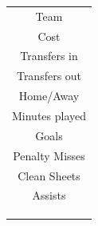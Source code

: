 \begin{table}[H]
\begin{minipage}{.5\textwidth}
\begin{tabular}{c}
Team                                  \\
Cost                                  \\
Transfers in                          \\
Transfers out                         \\
Home/Away                             \\
Minutes played                        \\
Goals                                   \\
Penalty Misses                          \\
Clean Sheets                            \\
Assists                                 \\
\\
\\
\\

    \end{tabular}
\label{tab:sig_var_MID_1}
\end{minipage}
\end{table}

